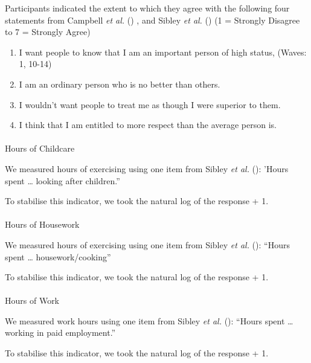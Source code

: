 \documentclass[
  single column]{article}
\makeatletter
\let\oldparagraph\paragraph
\renewcommand{\paragraph}{
    \@ifstar
      \xxxParagraphStar
      \xxxParagraphNoStar
  }
\newcommand{\xxxParagraphStar}[1]{\oldparagraph*{#1}\mbox{}}
\newcommand{\xxxParagraphNoStar}[1]{\oldparagraph{#1}\mbox{}}
\providecommand{\tightlist}{%
  \setlength{\itemsep}{0pt}\setlength{\parskip}{0pt}}\usepackage{longtable,booktabs,array}
\makeatother
\begin{document}
Participants indicated the extent to which they agree with the following
four statements from Campbell \emph{et al.}
() , and Sibley \emph{et al.}
() (1 = Strongly Disagree to 7 = Strongly
Agree)

\begin{enumerate}
\def\labelenumi{\roman{enumi}.}
\tightlist
\item
  I want people to know that I am an important person of high status,
  (Waves: 1, 10-14)
\item
  I am an ordinary person who is no better than others.
\item
  I wouldn't want people to treat me as though I were superior to them.
\item
  I think that I am entitled to more respect than the average person is.
\end{enumerate}

\paragraph{Hours of Childcare}\label{hours-of-childcare}

We measured hours of exercising using one item from Sibley \emph{et al.}
(): 'Hours spent \ldots{} looking after
children.''

To stabilise this indicator, we took the natural log of the response +
1.

\paragraph{Hours of Housework}\label{hours-of-housework}

We measured hours of exercising using one item from Sibley \emph{et al.}
(): ``Hours spent \ldots{}
housework/cooking''

To stabilise this indicator, we took the natural log of the response +
1.

\paragraph{Hours of Work}\label{hours-of-work}

We measured work hours using one item from Sibley \emph{et al.}
(): ``Hours spent \ldots{} working in
paid employment.''

To stabilise this indicator, we took the natural log of the response +
1.
\end{document}
